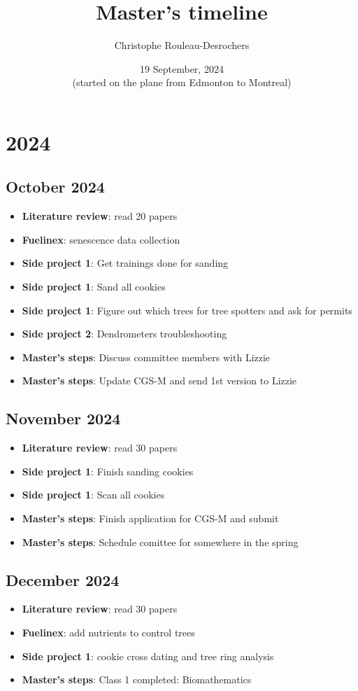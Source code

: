 \documentclass{article}
\title{Master's timeline}
\author[]{Christophe Rouleau-Desrochers}
\date{19 September, 2024 \\ (started on the plane from Edmonton to Montreal)}
\begin{document}
\maketitle

\section{2024}
\subsection {October 2024}
\begin {itemize}
	\item \textbf{Literature review}: read 20 papers
	\item \textbf{Fuelinex}: senescence data collection
	\item \textbf{Side project 1}: Get trainings done for sanding 
	\item \textbf{Side project 1}: Sand all cookies
	\item \textbf{Side project 1}: Figure out which trees for tree spotters and ask for permits
	\item \textbf{Side project 2}: Dendrometers troubleshooting
	\item \textbf{Master's steps}: Discuss committee members with Lizzie 
	\item \textbf{Master's steps}: Update CGS-M and send 1st version to Lizzie
\end {itemize}

\subsection {November 2024}
\begin {itemize}
	\item \textbf{Literature review}: read 30 papers
	\item \textbf{Side project 1}: Finish sanding cookies
	\item \textbf{Side project 1}: Scan all cookies
	\item \textbf{Master's steps}: Finish application for CGS-M and submit
	\item \textbf{Master's steps}: Schedule comittee for somewhere in the spring
\end {itemize}

\subsection {December 2024}
\begin {itemize}
	\item \textbf{Literature review}: read 30 papers
	\item \textbf{Fuelinex}: add nutrients to control trees
	\item \textbf{Side project 1}: cookie cross dating and tree ring analysis
	\item \textbf{Master's steps}: Class 1 completed: Biomathematics
\end {itemize}
\end{document}
